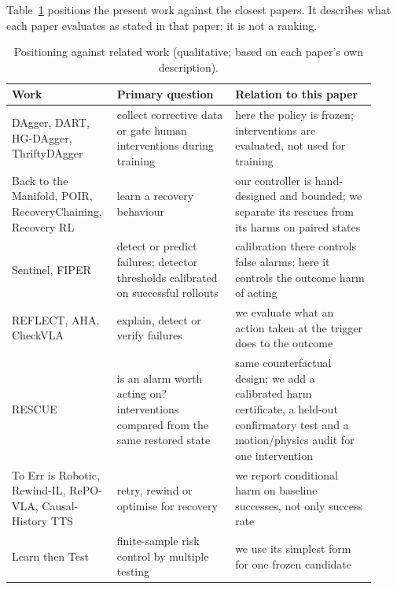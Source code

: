 Table~\ref{tab:related} positions the present work against the closest papers. It describes what each paper evaluates as stated in that paper; it is not a ranking.

\begin{table}[!htbp]
\centering\footnotesize
\caption{Positioning against related work (qualitative; based on each paper's own description).}\label{tab:related}
\begin{tabular}{p{0.24\linewidth}p{0.31\linewidth}p{0.37\linewidth}}
\toprule
Work & Primary question & Relation to this paper\\
\midrule
DAgger, DART, HG-DAgger, ThriftyDAgger \cite{ross2011dagger,laskey2017dart,kelly2019hgdagger,hoque2022thrifty} & collect corrective data or gate human interventions during training & here the policy is frozen; interventions are evaluated, not used for training\\
Back to the Manifold, POIR, RecoveryChaining, Recovery RL \cite{reichlin2022manifold,cideron2023getback,vats2025recoverychaining,thananjeyan2021recoveryrl} & learn a recovery behaviour & our controller is hand-designed and bounded; we separate its rescues from its harms on paired states\\
Sentinel, FIPER \cite{agia2025unpacking,romer2025fiper} & detect or predict failures; detector thresholds calibrated on successful rollouts & calibration there controls false alarms; here it controls the outcome harm of acting\\
REFLECT, AHA, CheckVLA \cite{liu2023reflect,duan2025aha,liu2026checkvla} & explain, detect or verify failures & we evaluate what an action taken at the trigger does to the outcome\\
RESCUE \cite{ahmedt2026rescue} & is an alarm worth acting on? interventions compared from the same restored state & same counterfactual design; we add a calibrated harm certificate, a held-out confirmatory test and a motion/physics audit for one intervention\\
To Err is Robotic, Rewind-IL, RePO-VLA, Causal-History TTS \cite{du2024toerr,zheng2026rewind,liufu2026repovla,li2026causalhistory} & retry, rewind or optimise for recovery & we report conditional harm on baseline successes, not only success rate\\
Learn then Test \cite{angelopoulos2021ltt} & finite-sample risk control by multiple testing & we use its simplest form for one frozen candidate\\
\bottomrule
\end{tabular}
\end{table}
